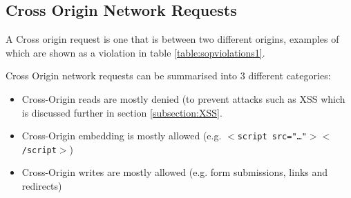 \documentclass{mscreport}
\begin{document}
\begin{table}[h!]
  \begin{center}
    \caption{Same Origin triplet example violations}
    \label{table:sopviolations1} %
  \end{center}
\end{table}

\subsection{Cross Origin Network Requests}
A Cross origin request is one that is between two different origins, examples of which are shown as a violation in table \ref{table:sopviolations1}.

\vspace{0.3cm} \noindent
Cross Origin network requests can be summarised into 3 different categories:
\begin{itemize}
	\setlength\itemsep{0.1em}
	\item Cross-Origin reads are mostly denied (to prevent attacks such as XSS which is discussed further in section \ref{subsection:XSS}.
	\item Cross-Origin embedding is mostly allowed (e.g. \texttt{$<$script src="…"$><$/script$>$})
	\item Cross-Origin writes are mostly allowed (e.g. form submissions, links and redirects)
\end{itemize}
\end{document}
